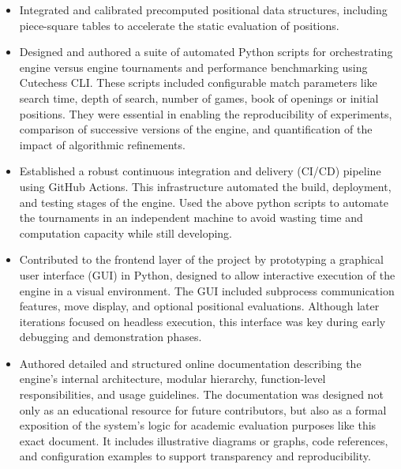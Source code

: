 \begin{itemize}
    \item Integrated and calibrated precomputed positional data structures, including piece-square tables to accelerate the static evaluation of positions.

    \item Designed and authored a suite of automated Python scripts for orchestrating engine versus engine tournaments and performance benchmarking using Cutechess CLI. These scripts included configurable match parameters like search time, depth of search, number of games, book of openings or initial positions. They were essential in enabling the reproducibility of experiments, comparison of successive versions of the engine, and quantification of the impact of algorithmic refinements.

    \item Established a robust continuous integration and delivery (CI/CD) pipeline using GitHub Actions. This infrastructure automated the build, deployment, and testing stages of the engine. Used the above python scripts to automate the tournaments in an independent machine to avoid wasting time and computation capacity while still developing.

    \item Contributed to the frontend layer of the project by prototyping a graphical user interface (GUI) in Python, designed to allow interactive execution of the engine in a visual environment. The GUI included subprocess communication features, move display, and optional positional evaluations. Although later iterations focused on headless execution, this interface was key during early debugging and demonstration phases.

    \item Authored detailed and structured online documentation describing the engine's internal architecture, modular hierarchy, function-level responsibilities, and usage guidelines. The documentation was designed not only as an educational resource for future contributors, but also as a formal exposition of the system's logic for academic evaluation purposes like this exact document. It includes illustrative diagrams or graphs, code references, and configuration examples to support transparency and reproducibility.
\end{itemize}
